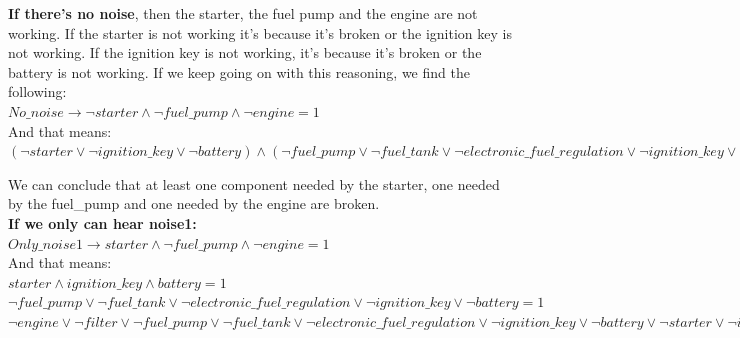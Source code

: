 \documentclass[paper=a4, fontsize=11pt]{scrartcl} %
\numberwithin{equation}{section} %
\numberwithin{figure}{section} %
\numberwithin{table}{section} %
\begin{document}
 \textbf{If there's no noise}, then the starter, the fuel pump and the engine are not working. If the starter is not working it's because it's broken or the ignition key is not working. If the ignition key is not working, it's because it's broken or the battery is not working. If we keep going on with this reasoning, we find the following:\\
		
		$ No\_noise \rightarrow \lnot starter \land \lnot fuel\_pump \land \lnot engine = 1 $\\
		
		And that means: \\
		
		$ (\lnot starter \lor \lnot ignition\_key \lor \lnot battery) \land (\lnot fuel\_pump \lor \lnot fuel\_tank \lor \lnot electronic\_fuel\_regulation \lor \lnot ignition\_key \lor \lnot battery) \land (\lnot engine \lor \lnot filter \lor \lnot fuel\_pump \lor \lnot fuel\_tank \lor \lnot electronic\_fuel\_regulation \lor \lnot ignition\_key \lor \lnot battery \lor \lnot starter \lor \lnot ignition\_key \lor \lnot battery) = 1 $
		
			
		We can conclude that at least one component needed by the starter, one needed by the fuel\_pump and one needed by the engine are broken.\\
		
		
		
		
		
\textbf{If we only can hear noise1:}\\
		
		$ Only\_noise1 \rightarrow  starter \land \lnot fuel\_pump \land \lnot engine = 1 $\\
		
		And that means: \\
		
	$ starter \land ignition\_key \land battery =1 $\\
	$ \lnot fuel\_pump \lor \lnot fuel\_tank \lor \lnot electronic\_fuel\_regulation \lor \lnot ignition\_key \lor \lnot battery =1 $\\
	$ \lnot engine \lor \lnot filter \lor \lnot fuel\_pump \lor \lnot fuel\_tank \lor \lnot electronic\_fuel\_regulation \lor \lnot ignition\_key \lor \lnot battery \lor \lnot starter \lor \lnot ignition\_key \lor \lnot battery = 1 $
		
\end{document}

